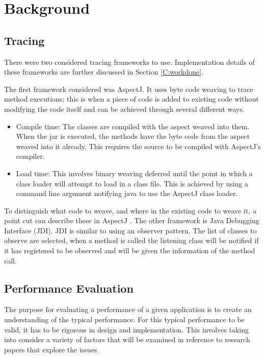 \chapter{Background}\label{C:related}

\section{Tracing}

There were two considered tracing frameworks to use. Implementation details of these frameworks are further discussed in Section \ref{C:workdone}.

The first framework considered was AspectJ. It uses byte code weaving to trace method executions; this is when a piece of code is added to existing code without modifying the code itself and can be achieved through several different ways.

\begin{itemize}
\item Compile time:
The classes are compiled with the aspect weaved into them. When the jar is executed, the methods have the byte code from the aspect weaved into it already. This requires the source to be compiled with AspectJ's compiler.
\item Load time:
This involves binary weaving deferred until the point in which a class loader will attempt to load in a class file. This is achieved by using a command line argument notifying java to use the AspectJ class loader.
\end{itemize}

To distinguish what code to weave, and where in the existing code to weave it, a point cut can describe these in AspectJ \cite{aspectwiki}. The other framework is Java Debugging Interface (JDI). JDI is similar to using an observer pattern. The list of classes to observe are selected, when a method is called the listening class will be notified if it has registered to be observed and will be given the information of the method call. 

\section{Performance Evaluation}
\label{performanceEvalBG}
The purpose for evaluating a performance of a given application is to create an understanding of the typical performance. For this typical performance to be valid, it has to be rigorous in design and implementation. This involves taking into consider a variety of factors that will be examined in reference to research papers that explore the issues.

